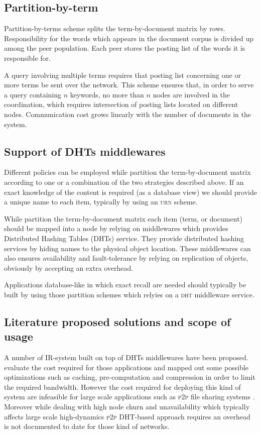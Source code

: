 \subsection{Partition-by-term} Partition-by-terms scheme splits the term-by-document matrix by rows. Responsibility for the words which appears in the document corpus is divided up among the peer population. Each peer stores the posting list of the words it is responsible for.

A query involving multiple terms requires that posting list concerning one or more terms be sent over the network. This scheme ensures that, in order to serve a query containing $n$ keywords, no more than $n$ nodes are involved in the coordination, which requires intersection of posting lists located on different nodes. Communication cost grows linearly with the number of documents in the system.

\subsection{Support of DHTs middlewares}
Different policies can be employed while partition the term-by-document matrix according to one or a combination of the two strategies described above. If an exact knowledge of the content is required (as a database view) we should provide a unique name to each item, typically by using an \textsc{urn} scheme.

While partition the term-by-document matrix each item (term, or document) should be mapped into a node by relying on middlewares which provides Distributed Hashing Tables (DHTs) service. They provide distributed hashing services by hiding names to the physical object location. These middlewares can also ensures availability and fault-tolerance by relying on replication of objects, obviously by accepting an extra overhead.

Applications database-like in which exact recall are needed should typically be built by using those partition schemes which relyies on a \textsc{dht} middleware service.

\subsection{Literature proposed solutions and scope of usage} A number of IR-system built on top of DHTs middlewares have been proposed. \cite{RV03, LLH+03} evaluate the cost required for those applications and mapped out some possible optimizations such as caching, pre-computation and compression in order to limit the required bandwidth. However the cost required for deploying this kind of system are infeasible for large scale applications such as \textsc{p2p} file sharing systems \cite{YDRC06, ZMSM05}. Moreover while dealing with high node churn and unavailability which typically affects large scale high-dynamics \textsc{p2p} DHT-based approach requires an overhead is not documented to date for those kind of networks.

